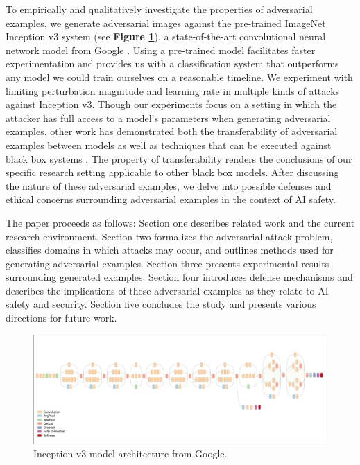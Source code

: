 \documentclass[]{article}
\begin{document}
To empirically and qualitatively investigate the properties of adversarial examples, we generate adversarial images against the pre-trained ImageNet Inception v3 system (see \textbf{Figure \ref{fig:inception}}), a state-of-the-art convolutional neural network model from Google \citep{DBLP:journals/corr/SzegedyVISW15}. Using a pre-trained model facilitates faster experimentation and provides us with a classification system that outperforms any model we could train ourselves on a reasonable timeline. We experiment with limiting perturbation magnitude and learning rate in multiple kinds of attacks against Inception v3. Though our experiments focus on a setting in which the attacker has full access to a model's parameters when generating adversarial examples, other work has demonstrated both the transferability of adversarial examples between models as well as techniques that can be executed against black box systems \citep{DBLP:journals/corr/PapernotMG16, DBLP:journals/corr/PapernotMGJCS16, DBLP:journals/corr/EvtimovEFKLPRS17}. The property of transferability renders the conclusions of our specific research setting applicable to other black box models. After discussing the nature of these adversarial examples, we delve into possible defenses and ethical concerns surrounding adversarial examples in the context of AI safety.

The paper proceeds as follows: Section one describes related work and the current research environment. Section two formalizes the adversarial attack problem, classifies domains in which attacks may occur, and outlines methods used for generating adversarial examples. Section three presents experimental results surrounding generated examples. Section four introduces defense mechanisms and describes the implications of these adversarial examples as they relate to AI safety and security. Section five concludes the study and presents various directions for future work.

\begin{figure}
    \centering
    \includegraphics[width=\textwidth]{inception-v3.png}
    \caption{Inception v3 model architecture from Google.}
    \label{fig:inception}
\end{figure}
\end{document}
